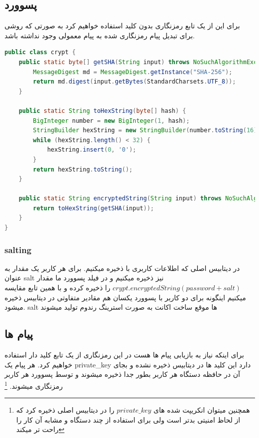 \documentclass[12pt]{article}
\begin{document}
\subsection{پسوورد}
برای این از یک تابع رمزنگاری بدون کلید
استفاده خواهیم کرد به صورتی که روشی برای تبدیل
پیام رمزنگاری شده به پیام معمولی وجود نداشته باشد.\\
\begin{latin}
    \begin{lstlisting}[language=Java,label={lst:code}, mathescape=true, breaklines=true]
public class crypt {
    public static byte[] getSHA(String input) throws NoSuchAlgorithmException {
        MessageDigest md = MessageDigest.getInstance("SHA-256");
        return md.digest(input.getBytes(StandardCharsets.UTF_8));
    }

    public static String toHexString(byte[] hash) {
        BigInteger number = new BigInteger(1, hash);
        StringBuilder hexString = new StringBuilder(number.toString(16));
        while (hexString.length() < 32) {
            hexString.insert(0, '0');
        }
        return hexString.toString();
    }

    public static String encryptedString(String input) throws NoSuchAlgorithmException {// actual method used
        return toHexString(getSHA(input));
    }
}        
    \end{lstlisting}
\end{latin}
\subsubsection{salting}
در دیتابیس اصلی که اطلاعات کاربری با ذخیره میکنیم. برای هر کاربر یک مقدار به عنوان
salt نیز ذخیره میکنیم و در فیلد پسوورد ما مقدار $crypt.encryptedString(password + salt)$ را
ذخیره کرده و با همین تابع مقایسه میکنیم اینگونه برای دو کاربر با پسوورد یکسان هم
مقادیر متفاوتی در دیتابیس ذخیره میشود.
salt ها موقع ساخت اکانت به صورت استرینگ رندوم  تولید میشوند
\subsection{پیام ها}
برای اینکه نیاز به بازیابی پیام ها هست در این رمزنگاری از یک تابع
کلید دار استفاده خواهیم کرد.
هر پیام یک  private\_key دارد
این کلید ها در دیتابیس ذخیره نشده و بجای آن در حافظه دستگاه
هر کاربر بطور جدا ذخیره میشوند و توسط پسوورد هر کاربر رمزنگاری
میشوند.
\footnote{همچنین میتوان انکریپت شده های $private\_key$ را
    در دیتابیس اصلی ذخیره کرد که از لحاظ امنیتی بدتر است ولی
    برای استفاده از چند دستگاه و مشابه آن کار را راحت تر
    میکند}
\pagebreak
\end{document}
